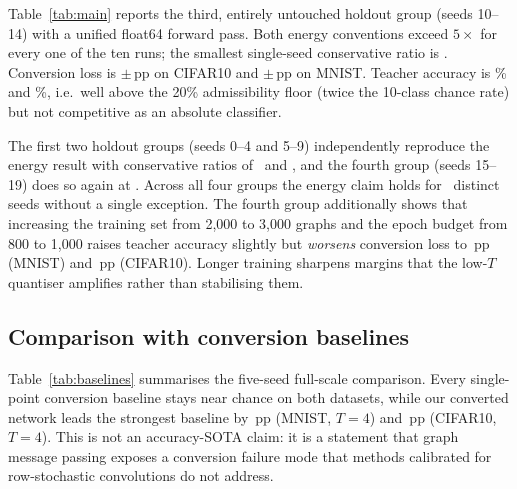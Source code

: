 Table~\ref{tab:main} reports the third, entirely untouched holdout group (seeds 10--14) with a unified float64 forward pass. Both energy conventions exceed $5\times$ for every one of the ten runs; the smallest single-seed conservative ratio is \MinCons. Conversion loss is \CIFARLoss$\pm$\CIFARLossStd\,pp on CIFAR10 and \MNISTLoss$\pm$\MNISTLossStd\,pp on MNIST. Teacher accuracy is \CIFARAnn\% and \MNISTAnn\%, i.e.\ well above the 20\% admissibility floor (twice the 10-class chance rate) but not competitive as an absolute classifier.

\begin{table}[t]
\centering
\caption{Five-seed results on untouched holdout seeds 10--14. Energy is a 45\,nm theoretical arithmetic estimate under two conventions; loss is conversion loss in percentage points (lower is better). Every one of the ten individual conservative ratios exceeds 5.464$\times$.}
\label{tab:main}

\end{table}

The first two holdout groups (seeds 0--4 and 5--9) independently reproduce the energy result with conservative ratios of \EarlierConsA\ and \EarlierConsB, and the fourth group (seeds 15--19) does so again at \FourthCons. Across all four groups the energy claim holds for \TotalSeeds\ distinct seeds without a single exception. The fourth group additionally shows that increasing the training set from 2,000 to 3,000 graphs and the epoch budget from 800 to 1,000 raises teacher accuracy slightly but \emph{worsens} conversion loss to \EIGHTEENMNISTLoss\,pp (MNIST) and \EIGHTEENCIFARLoss\,pp (CIFAR10). Longer training sharpens margins that the low-$T$ quantiser amplifies rather than stabilising them.

\subsection{Comparison with conversion baselines}
\label{ssec:comparison}

Table~\ref{tab:baselines} summarises the five-seed full-scale comparison. Every single-point conversion baseline stays near chance on both datasets, while our converted network leads the strongest baseline by \MarginMNIST\,pp (MNIST, $T{=}4$) and \MarginCIFAR\,pp (CIFAR10, $T{=}4$). This is not an accuracy-SOTA claim: it is a statement that graph message passing exposes a conversion failure mode that methods calibrated for row-stochastic convolutions do not address.

\begin{table}[t]
\centering
\caption{Five-seed top-1 (\%) at $T{=}4$ and $T{=}8$ for all adapted conversion baselines. Chance is 10\%.}
\label{tab:baselines}

\end{table}

